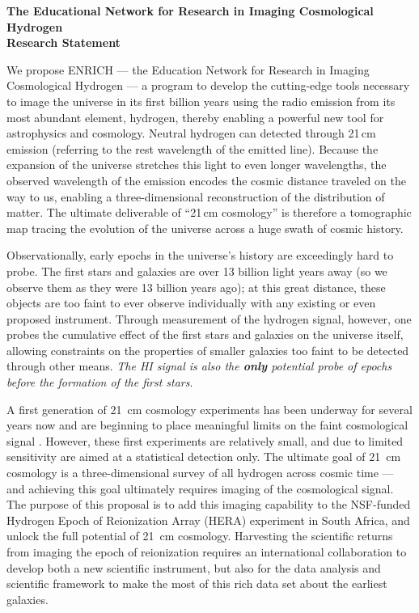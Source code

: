 \documentclass[preprint,11pt]{aastex}
\begin{document}
\setlength{\parindent}{0cm}
\textbf{\large The Educational Network for Research in Imaging Cosmological Hydrogen}\\
\textbf{Research Statement}
\vspace{6pt}
\setlength{\parindent}{17pt}

We propose ENRICH --- the Education Network for Research in Imaging Cosmological Hydrogen --- a program to develop the cutting-edge tools necessary to image the universe in its first billion years using the radio emission from its most abundant element, hydrogen, thereby enabling a powerful new tool for astrophysics and cosmology.  Neutral hydrogen can detected through 21\,cm emission (referring to the rest wavelength of the emitted line).  Because the expansion of the universe stretches this light to even longer wavelengths, the observed wavelength of the emission encodes the cosmic distance traveled on the way to us, enabling a three-dimensional reconstruction of the distribution of matter.  The ultimate deliverable of ``21\,cm cosmology'' is therefore a tomographic map tracing the evolution of the universe across a huge swath of cosmic history.

Observationally, early epochs in the universe's history are exceedingly hard to probe. The first stars and galaxies are over 13 billion light years away (so we observe them as they were 13 billion years ago); at this great distance, these objects are too faint to ever observe individually with any existing or even proposed instrument.  Through measurement of the hydrogen signal, however, one probes the cumulative effect of the first stars and galaxies on the universe itself, allowing constraints on the properties of smaller galaxies too faint to be detected through other means.  \emph{The HI signal is also the \textbf{only} potential probe of epochs before the formation of the first stars}.

A first generation of 21\, cm cosmology experiments has been underway for several years now and are beginning to place meaningful limits on the faint cosmological signal \citep{parsons_et_al_2014,jacobs_et_al_2015,ali_et_al_2015,pober_et_al_2015}.  However, these first experiments are relatively small, and due to limited sensitivity are aimed at a statistical detection only.  The ultimate goal of 21\, cm cosmology is a three-dimensional survey of all hydrogen across cosmic time --- and achieving this goal ultimately requires imaging of the cosmological signal.  The purpose of this proposal is to add this imaging capability to the NSF-funded Hydrogen Epoch of Reionization Array (HERA) experiment in South Africa, and unlock the full potential of 21\, cm cosmology.  Harvesting the scientific returns from imaging the epoch of reionization requires an international collaboration to develop both a new scientific instrument, but also for the data analysis and scientific framework to make the most of this rich data set about the earliest galaxies.  
\end{document}
